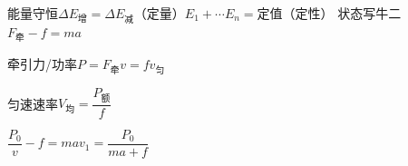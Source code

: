 能量守恒\quad $\Delta E_{\text{增}}=\Delta E_{\text{减}}$（定量）\quad $E_1+\cdots E_n=$定值（定性）
状态写牛二\quad $F_{\text{牵}}-f=ma$

牵引力/功率\quad $P=F_{\text{牵}}v=fv_{\text{匀}}$

匀速速率\quad $V_{\text{均}}=\dfrac{P_{\text{额}}}{f}$ %


$\dfrac{P_0}{v}-f=ma$\qquad $v_1=\dfrac{P_0}{ma+f}$
